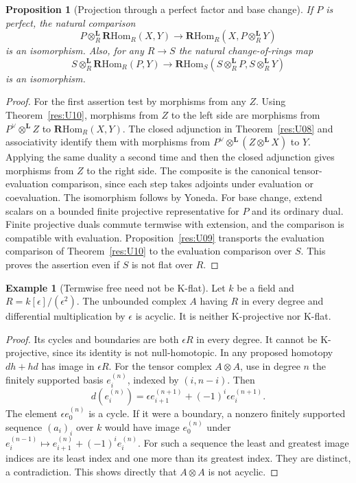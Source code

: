 \documentclass[11pt,oneside,openany]{book}
\newtheorem{proposition}[theorem]{Proposition}
\theoremstyle{definition}
\newtheorem{example}[theorem]{Example}
\theoremstyle{remark}
\begin{document}
\begin{proposition}[Projection through a perfect factor and base change]\label{res:U11}
If \(P\) is perfect, the natural comparison
\[
 P\otimes_R^{\mathbf L}\mathbf R\mathrm{Hom}_R(X,Y)
 \longrightarrow
 \mathbf R\mathrm{Hom}_R(X,P\otimes_R^{\mathbf L}Y)
\]
is an isomorphism. Also, for any \(R\to S\) the natural
change-of-rings map
\[
 S\otimes_R^{\mathbf L}\mathbf R\mathrm{Hom}_R(P,Y)
  \longrightarrow
 \mathbf R\mathrm{Hom}_S(S\otimes_R^{\mathbf L}P,
                          S\otimes_R^{\mathbf L}Y)
\]
is an isomorphism.
\end{proposition}
\begin{proof}
For the first assertion test by morphisms from any \(Z\).
Using Theorem~\ref{res:U10}, morphisms from \(Z\) to the
left side are morphisms from \(P^\vee\otimes^{\mathbf L}Z\)
to \(\mathbf R\mathrm{Hom}_R(X,Y)\). The closed adjunction
in Theorem~\ref{res:U08} and associativity identify them with
morphisms from \(P^\vee\otimes^{\mathbf L}(Z\otimes^{\mathbf L}X)\)
to \(Y\). Applying the same duality a second time and
then the closed adjunction gives morphisms from \(Z\) to the
right side. The composite is the canonical tensor-evaluation
comparison, since each step takes adjoints under evaluation
or coevaluation. The isomorphism follows by Yoneda.
For base change, extend scalars on a bounded finite
projective representative for \(P\) and its ordinary dual.
Finite projective duals commute termwise with extension,
and the comparison is compatible with evaluation.
Proposition~\ref{res:U09} transports the evaluation comparison
of Theorem~\ref{res:U10} to the evaluation comparison over \(S\).
This proves the assertion even if \(S\) is not flat over \(R\).
\end{proof}

\begin{example}[Termwise free need not be K-flat]\label{res:U12}
Let \(k\) be a field and \(R=k[\epsilon]/(\epsilon^2)\).
The unbounded complex \(A\) having \(R\) in every degree and
differential multiplication by \(\epsilon\) is acyclic.
It is neither K-projective nor K-flat.
\end{example}
\begin{proof}
Its cycles and boundaries are both \(\epsilon R\) in every degree.
It cannot be K-projective, since its identity is not null-homotopic.
In any proposed homotopy \(d h+h d\) has image in \(\epsilon R\).
For the tensor complex \(A\otimes A\), use in degree \(n\) the
finitely supported basis \(e_i^{(n)}\), indexed by \((i,n-i)\).
Then
\[
 d(e_i^{(n)})=\epsilon e_{i+1}^{(n+1)}
                 +(-1)^i\epsilon e_i^{(n+1)}.
\]
The element \(\epsilon e_0^{(n)}\) is a cycle. If it were a boundary,
a nonzero finitely supported sequence \((a_i)_i\) over \(k\)
would have image \(e_0^{(n)}\) under
\(e_i^{(n-1)}\mapsto e_{i+1}^{(n)}+(-1)^i e_i^{(n)}\).
For such a sequence the least and greatest image indices are its
least index and one more than its greatest index. They are
distinct, a contradiction. This shows directly that \(A\otimes A\)
is not acyclic.
\end{proof}
\end{document}
